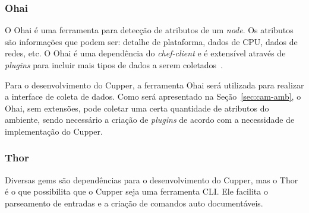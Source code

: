 \subsubsection{Ohai}
\label{sec:deps:ohai}

O Ohai é uma ferramenta para detecção de atributos de um \textit{node}. Os atributos são
informações que podem ser: detalhe de plataforma, dados de CPU, dados de redes, etc.
O Ohai é uma dependência do \textit{chef-client} e é extensível através de \textit{plugins}
para incluir mais tipos de dados a serem coletados~\cite{ohaidoc:2016}.

Para o desenvolvimento do Cupper, a ferramenta Ohai será utilizada para realizar a
interface de coleta de dados. Como será apresentado na Seção~\ref{sec:cam-amb}, o
Ohai, sem extensões, pode coletar uma certa quantidade de atributos do ambiente, sendo
necessário a criação de \textit{plugins} de acordo com a necessidade de implementação do Cupper.

\subsubsection{Thor}
\label{sec:deps:thor}

Diversas gems são dependências para o desenvolvimento do Cupper, mas o Thor
é o que possibilita que o Cupper seja uma ferramenta CLI\@. Ele facilita o
parseamento de entradas e a criação de comandos auto documentáveis.
